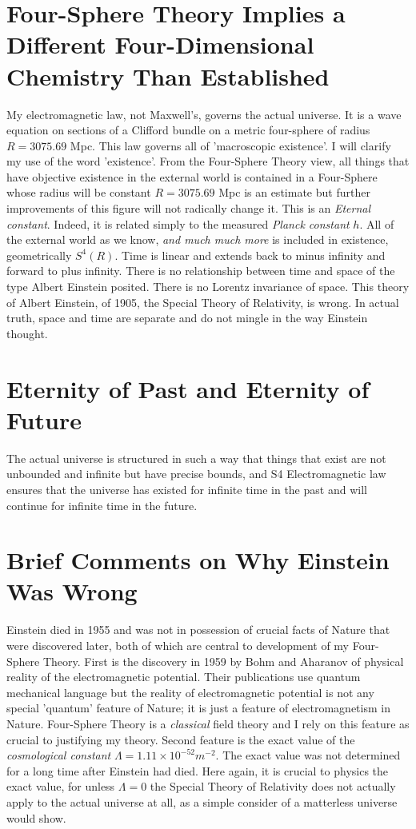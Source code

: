 \documentclass{amsart}
\begin{document}
\section{Four-Sphere Theory Implies a Different Four-Dimensional Chemistry Than Established}

My electromagnetic law, not Maxwell's, governs the actual universe.  It is a wave equation on sections of a Clifford bundle on a metric four-sphere of radius $R=3075.69$ Mpc. This law governs all of 'macroscopic existence'.  I will clarify my use of the word 'existence'.  From the Four-Sphere Theory view, all things that have objective existence in the external world is contained in a Four-Sphere whose radius will be constant $R=3075.69$ Mpc is an estimate but further improvements of this figure will not radically change it.  This is an {\em Eternal constant}.  Indeed, it is related simply to the measured {\em Planck constant} $h$.  All of the external world as we know, {\em and much much more} is included in existence, geometrically $S^4(R)$.  Time is linear and extends back to minus infinity and forward to plus infinity.  There is no relationship between time and space of the type Albert Einstein posited.  There is no Lorentz invariance of space.  This theory of Albert Einstein, of 1905, the Special Theory of Relativity, is wrong.  In actual truth, space and time are separate and do not mingle in the way Einstein thought.

\section{Eternity of Past and Eternity of Future}

The actual universe is structured in such a way that things that exist are not unbounded and infinite but have precise bounds, and S4 Electromagnetic law ensures that the universe has existed for infinite time in the past and will continue for infinite time in the future.

\section{Brief Comments on Why Einstein Was Wrong}

Einstein died in 1955 and was not in possession of crucial facts of Nature that were discovered later, both of which are central to development of my Four-Sphere Theory. First is the discovery in 1959 by Bohm and Aharanov of physical reality of the electromagnetic potential.  Their publications use quantum mechanical language but the reality of electromagnetic potential is not any special 'quantum' feature of Nature; it is just a feature of electromagnetism in Nature.  Four-Sphere Theory is a {\em classical} field theory and I rely on this feature as crucial to justifying my theory.  Second feature is the exact value of the {\em cosmological constant} $\Lambda=1.11 \times 10^{-52} m^{-2}$.  The exact value was not determined for a long time after Einstein had died.  Here again, it is crucial to physics the exact value, for unless $\Lambda=0$ the Special Theory of Relativity does not actually apply to the actual universe at all, as a simple consider of a matterless universe would show.
\end{document}
